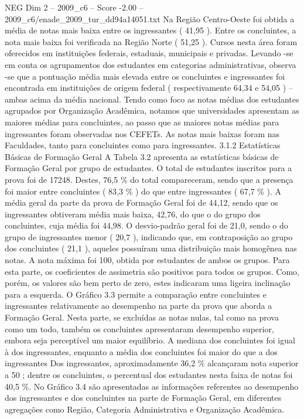 \begin{textsample}{NEG Dim 2 – 2009\_c6 – Score -2.00 – 2009\_c6/enade\_2009\_tur\_dd94a14051.txt}
Na Região Centro-Oeste foi obtida a média de notas mais baixa entre os ingressantes ( 41,95 ).
Entre os concluintes, a nota mais baixa foi verificada na Região Norte ( 51,25 ).
Cursos nesta área foram oferecidos em instituições federais, estaduais, municipais e privadas.
Levando -se em conta os agrupamentos dos estudantes em categorias administrativas, observa -se que a pontuação média mais elevada entre os concluintes e ingressantes foi encontrada em instituições de origem federal ( respectivamente 64,34 e 54,05 ) – ambas acima da média nacional.
Tendo como foco as notas médias dos estudantes agrupados por Organização Acadêmica, notamos que universidades apresentam as maiores médias para concluintes, ao passo que as maiores notas médias para ingressantes foram observadas nos CEFETs.
As notas mais baixas foram nas Faculdades, tanto para concluintes como para ingressantes. 3.1.2 Estatísticas Básicas de Formação Geral A Tabela 3.2 apresenta as estatísticas básicas de Formação Geral por grupo de estudantes.
O total de estudantes inscritos para a prova foi de 17248.
Destes, 76,5 \% do total compareceram, sendo que a presença foi maior entre concluintes ( 83,3 \% ) do que entre ingressantes ( 67,7 \% ).
A média geral da parte da prova de Formação Geral foi de 44,12, sendo que os ingressantes obtiveram média mais baixa, 42,76, do que o do grupo dos concluintes, cuja média foi 44,98.
O desvio-padrão geral foi de 21,0, sendo o do grupo de ingressantes menor ( 20,7 ), indicando que, em contraposição ao grupo dos concluintes ( 21,1 ), aqueles possuíram uma distribuição mais homogênea nas notas.
A nota máxima foi 100, obtida por estudantes de ambos os grupos.
Para esta parte, os coeficientes de assimetria são positivos para todos os grupos.
Como, porém, os valores são bem perto de zero, estes indicaram uma ligeira inclinação para a esquerda.
O Gráfico 3.3 permite a comparação entre concluintes e ingressantes relativamente ao desempenho na parte da prova que aborda a Formação Geral.
Nesta parte, se excluídas as notas nulas, tal como na prova como um todo, também os concluintes apresentaram desempenho superior, embora seja perceptível um maior equilíbrio.
A mediana dos concluintes foi igual à dos ingressantes, enquanto a média dos concluintes foi maior do que a dos ingressantes Dos ingressantes, aproximadamente 36,2 \% alcançaram nota superior a 50 ; dentre os concluintes, o percentual dos estudantes nesta faixa de notas foi 40,5 \%.
No Gráfico 3.4 são apresentadas as informações referentes ao desempenho dos ingressantes e dos concluintes na parte de Formação Geral, em diferentes agregações como Região, Categoria Administrativa e Organização Acadêmica.

\end{textsample}
